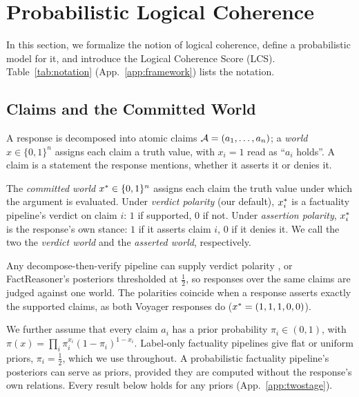 \section{Probabilistic Logical Coherence}
\label{sec:framework}

In this section, we formalize the notion of logical coherence, define a probabilistic model for it, 
and introduce the Logical Coherence Score (LCS). Table~\ref{tab:notation} (App.~\ref{app:framework})
lists the notation. 

\subsection{Claims and the Committed World}
\label{sec:setup}

A response is decomposed into atomic claims $\mathcal{A}=(a_1,\dots,a_n)$; a \emph{world}
$x\in\{0,1\}^n$ assigns each claim a truth value, with $x_i=1$ read as ``$a_i$ holds''. A claim is a
statement the response mentions, whether it asserts it or denies it.


\begin{definition}
\label{def:committed}
The \emph{committed world} $x^{\ast}\in\{0,1\}^n$ assigns each claim the truth value under which the
argument is evaluated. Under \emph{verdict polarity} (our default), $x^{\ast}_i$ is a factuality
pipeline's verdict on claim $i$: $1$ if supported, $0$ if not. Under \emph{assertion polarity},
$x^{\ast}_i$ is the response's own stance: $1$ if it asserts claim $i$, $0$ if it denies it. We call the
two the \emph{verdict world} and the \emph{asserted world}, respectively.
\end{definition}

Any decompose-then-verify pipeline can supply verdict polarity \citep{factscore,safe,veriscore}, or
FactReasoner's posteriors \citep{factreasoner} thresholded at $\frac12$, so responses over the same
claims are judged against one world. The polarities coincide when a response asserts exactly the
supported claims, as both Voyager responses do ($x^{\ast}=(1,1,1,0,0)$).

We further assume that every claim $a_i$ has a prior probability $\pi_i\in(0,1)$, with
$\pi(x)=\prod_i\pi_i^{x_i}(1-\pi_i)^{1-x_i}$. Label-only factuality pipelines give flat or uniform priors,
$\pi_i=\frac12$, which we use throughout. A probabilistic factuality pipeline's posteriors can serve as priors,
provided they are computed without the response's own relations. Every result below holds for any
priors (App.~\ref{app:twostage}).

